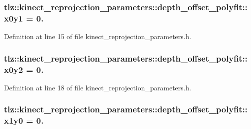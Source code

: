 \subsubsection[{\texorpdfstring{x0y1}{x0y1}}]{ tlz\+::kinect\+\_\+reprojection\+\_\+parameters\+::depth\+\_\+offset\+\_\+polyfit\+::x0y1 = 0.}\hypertarget{structtlz_1_1kinect__reprojection__parameters_1_1depth__offset__polyfit_a66f698d2768cf12f59f3810fb5389cea}{}\label{structtlz_1_1kinect__reprojection__parameters_1_1depth__offset__polyfit_a66f698d2768cf12f59f3810fb5389cea}


Definition at line 15 of file kinect\+\_\+reprojection\+\_\+parameters.\+h.

\subsubsection[{\texorpdfstring{x0y2}{x0y2}}]{ tlz\+::kinect\+\_\+reprojection\+\_\+parameters\+::depth\+\_\+offset\+\_\+polyfit\+::x0y2 = 0.}\hypertarget{structtlz_1_1kinect__reprojection__parameters_1_1depth__offset__polyfit_a4c029c2acd3f81c152a52f9243ad0579}{}\label{structtlz_1_1kinect__reprojection__parameters_1_1depth__offset__polyfit_a4c029c2acd3f81c152a52f9243ad0579}


Definition at line 18 of file kinect\+\_\+reprojection\+\_\+parameters.\+h.

\subsubsection[{\texorpdfstring{x1y0}{x1y0}}]{ tlz\+::kinect\+\_\+reprojection\+\_\+parameters\+::depth\+\_\+offset\+\_\+polyfit\+::x1y0 = 0.}\hypertarget{structtlz_1_1kinect__reprojection__parameters_1_1depth__offset__polyfit_a05716b5c722f280ec0c01e203a162e97}{}\label{structtlz_1_1kinect__reprojection__parameters_1_1depth__offset__polyfit_a05716b5c722f280ec0c01e203a162e97}


